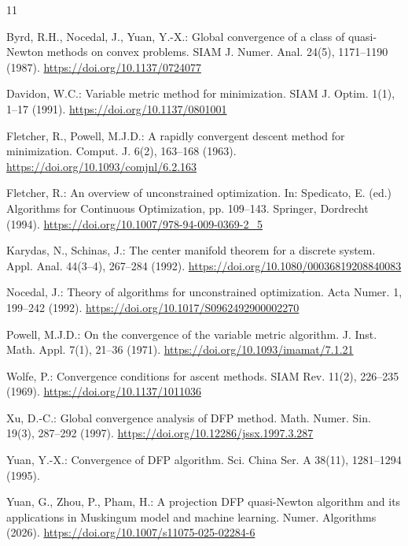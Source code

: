 \documentclass[smallextended,envcountsame]{svjour3}
\begin{document}
\begin{thebibliography}{11}

Byrd, R.H., Nocedal, J., Yuan, Y.-X.:
Global convergence of a class of quasi-Newton methods on convex problems.
SIAM J. Numer. Anal. 24(5), 1171--1190 (1987).
\url{https://doi.org/10.1137/0724077}

Davidon, W.C.:
Variable metric method for minimization.
SIAM J. Optim. 1(1), 1--17 (1991).
\url{https://doi.org/10.1137/0801001}

Fletcher, R., Powell, M.J.D.:
A rapidly convergent descent method for minimization.
Comput. J. 6(2), 163--168 (1963).
\url{https://doi.org/10.1093/comjnl/6.2.163}

Fletcher, R.:
An overview of unconstrained optimization.
In: Spedicato, E. (ed.) Algorithms for Continuous Optimization,
pp. 109--143.
Springer, Dordrecht (1994).
\url{https://doi.org/10.1007/978-94-009-0369-2_5}

Karydas, N., Schinas, J.:
The center manifold theorem for a discrete system.
Appl. Anal. 44(3--4), 267--284 (1992).
\url{https://doi.org/10.1080/00036819208840083}

Nocedal, J.:
Theory of algorithms for unconstrained optimization.
Acta Numer. 1, 199--242 (1992).
\url{https://doi.org/10.1017/S0962492900002270}

Powell, M.J.D.:
On the convergence of the variable metric algorithm.
J. Inst. Math. Appl. 7(1), 21--36 (1971).
\url{https://doi.org/10.1093/imamat/7.1.21}

Wolfe, P.:
Convergence conditions for ascent methods.
SIAM Rev. 11(2), 226--235 (1969).
\url{https://doi.org/10.1137/1011036}

Xu, D.-C.:
Global convergence analysis of DFP method.
Math. Numer. Sin. 19(3), 287--292 (1997).
\url{https://doi.org/10.12286/jssx.1997.3.287}

Yuan, Y.-X.:
Convergence of DFP algorithm.
Sci. China Ser. A 38(11), 1281--1294 (1995).

Yuan, G., Zhou, P., Pham, H.:
A projection DFP quasi-Newton algorithm and its applications in Muskingum
model and machine learning.
Numer. Algorithms (2026).
\url{https://doi.org/10.1007/s11075-025-02284-6}

\end{thebibliography}
\end{document}
